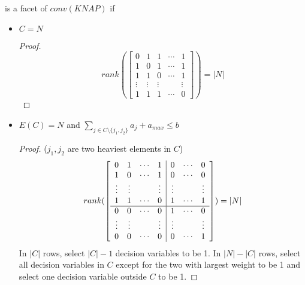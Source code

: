                     is a facet of $conv(KNAP)$ if
                    \begin{itemize}               
                        \item $C = N$
                            \begin{proof}
                                \begin{equation*}
                                    rank(\begin{bmatrix}
                                        0 & 1 & 1 & \cdots & 1 \\
                                        1 & 0 & 1 & \cdots & 1 \\
                                        1 & 1 & 0 & \cdots & 1 \\
                                        \vdots & \vdots & \vdots & & \vdots\\
                                        1 & 1 & 1 & \cdots & 0
                                        \end{bmatrix}) = |N|
                                \end{equation*}
                            \end{proof}

                        \item $E(C) = N$ and $\sum_{j\in C \setminus \{j_1, j_2\}} a_j + a_{max} \le b$
                            \begin{proof}
                                 ($j_1, j_2$ are two heaviest elements in $C$)
                                \begin{equation*}
                                    rank(\left[\begin{array}{c c c c | c c c}
                                        0 & 1 & \cdots & 1 & 0 & \cdots & 0 \\
                                        1 & 0 & \cdots & 1 & 0 & \cdots & 0 \\
                                        \vdots & \vdots & & \vdots & \vdots & & \vdots\\
                                        1 & 1 & \cdots & 0 & 1 & \cdots & 1 \\
                                        \hline
                                        0 & 0 & \cdots & 0 & 1 & \cdots & 0 \\
                                        \vdots & \vdots & & \vdots & \vdots & & \vdots\\
                                        0 & 0 & \cdots & 0 & 0 & \cdots & 1
                                        \end{array}\right]) = |N|
                                \end{equation*}
                                In $|C|$ rows, select $|C| - 1$ decision variables to be 1. In $|N| - |C|$ rows, select all decision variables in $C$ except for the two with largest weight to be 1 and select one decision variable outside $C$ to be 1.
                            \end{proof} 


\end{itemize}
